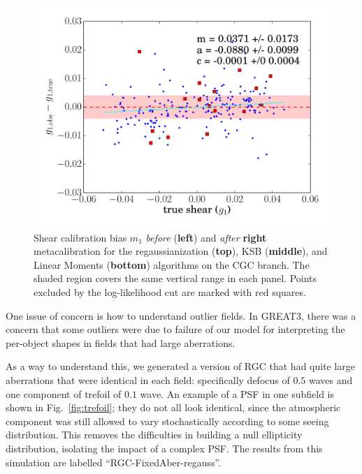 \documentclass[iop]{emulateapj}
\begin{document}
\begin{figure}[t]
\begin{center}
\includegraphics[width=0.46\linewidth]{./Plots/m1-moments-opt-shear_plots.pdf}
\end{center}
\caption{Shear calibration bias $m_1$ {\it before} ({\bf left}) and
  {\it after} {\bf right} metacalibration for the regaussianization
  ({\bf top}), KSB ({\bf middle}), and Linear Moments ({\bf bottom})
  algorithms on the CGC branch. The shaded region covers the same
  vertical range in each panel.  Points excluded by the log-likelihood
  cut are marked with red squares.}
\label{fig:m_comparison}
\end{figure}

One issue of concern is how to understand outlier fields.  In GREAT3,
there was a concern that some outliers were due to failure of our
model for interpreting the per-object shapes in fields that had large
aberrations.

As a way to understand this, we generated a version of RGC that had
quite large aberrations that were identical in each field:
specifically defocus of $0.5$ waves and one component of trefoil of
$0.1$ wave.  An example of a PSF in one subfield is shown in
Fig.~\ref{fig:trefoil}; they do not all look identical, since the
atmospheric component was still allowed to vary stochastically
according to some seeing distribution. This removes the difficulties
in building a null ellipticity distribution, isolating the impact of a
complex PSF. The results from this simulation are labelled
``RGC-FixedAber-regauss''.
\end{document}
